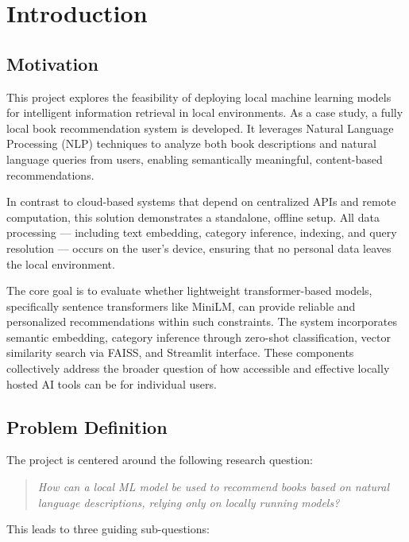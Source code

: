 \chapter{Introduction}
\label{chapter:introduction}

\section{Motivation}
\label{sec:motivation}

This project explores the feasibility of deploying local machine learning models for intelligent information retrieval in local environments. 
As a case study, a fully local book recommendation system is developed. 
It leverages Natural Language Processing (NLP) techniques to analyze both book descriptions and natural language queries from users, enabling semantically meaningful, content-based recommendations.

In contrast to cloud-based systems that depend on centralized APIs and remote computation, this solution demonstrates a standalone, offline setup. 
All data processing — including text embedding, category inference, indexing, and query resolution — occurs on the user’s device, ensuring that no personal data leaves the local environment.

The core goal is to evaluate whether lightweight transformer-based models, specifically sentence transformers like MiniLM, can provide reliable and personalized recommendations within such constraints. 
The system incorporates semantic embedding, category inference through zero-shot classification, vector similarity search via FAISS, and Streamlit interface. 
These components collectively address the broader question of how accessible and effective locally hosted AI tools can be for individual users.

\section{Problem Definition}
\label{sec:problem-definition}

The project is centered around the following research question:

\begin{quote}
\textit{How can a local ML model be used to recommend books based on natural language descriptions, relying only on locally running models?}
\end{quote}

This leads to three guiding sub-questions:

